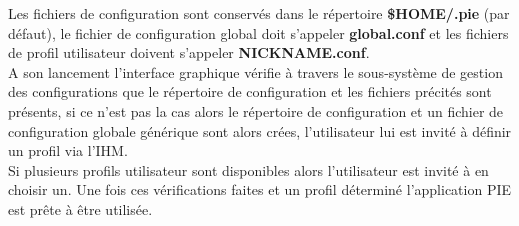 Les fichiers de configuration sont conservés dans le répertoire \textbf{\$HOME/.pie} (par défaut), le fichier
de configuration global doit s'appeler \textbf{global.conf} et les fichiers de profil utilisateur doivent
s'appeler \textbf{NICKNAME.conf}. \\

A son lancement l'interface graphique vérifie à travers le sous-système de gestion des configurations
que le répertoire de configuration et les fichiers précités sont présents, si ce n'est pas la cas alors le
répertoire de configuration et un fichier de configuration globale générique sont alors crées, l'utilisateur lui
est invité à définir un profil via l'IHM. \\

Si plusieurs profils utilisateur sont disponibles alors l'utilisateur est invité à en choisir un. Une fois ces
vérifications faites et un profil déterminé l'application PIE est prête à être utilisée.

